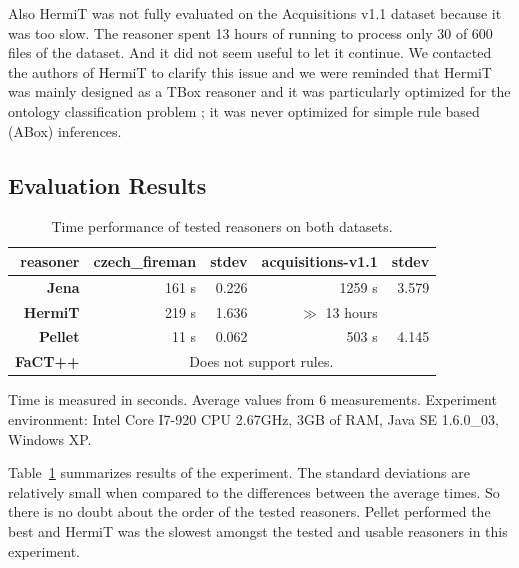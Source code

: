 Also HermiT was not fully evaluated on the Acquisitions v1.1 dataset because it was too slow. The reasoner spent 13 hours of running to process only 30 of 600 files of the dataset. And it did not seem useful to let it continue. We contacted the authors of HermiT to clarify this issue and we were reminded that HermiT was mainly designed as a TBox reasoner and it was particularly optimized for the ontology classification problem \citep{ghms10classification}; it was never optimized for simple rule based (ABox) inferences.












\subsection{Evaluation Results}



\begin{table}
\begin{center}
\begin{tabular}{|r||r|r||r|r|}
\hline
reasoner & \textbf{czech\_fireman} & stdev & \textbf{acquisitions-v1.1} & stdev\\
\hline
\hline
\textbf{Jena} & 161 s & 0.226 & 1259 s & 3.579\\
\hline
\textbf{HermiT} & 219 s & 1.636 & $\gg$ 13 hours & \\
\hline
\textbf{Pellet} & 11 s & 0.062 & 503 s & 4.145\\
\hline
\textbf{FaCT++} & \multicolumn{4}{|c|}{Does not support rules.}\\
\hline
\end{tabular}
\end{center}

Time is measured in seconds. Average values from 6 measurements. Experiment environment: Intel Core I7-920 CPU 2.67GHz, 3GB of RAM, Java SE 1.6.0\_03, Windows XP.

\caption{Time performance of tested reasoners on both datasets.}
\label{tab:results}
\end{table}

Table~\ref{tab:results} summarizes results of the experiment. The standard deviations are relatively small when compared to the differences between the average times.  So there is no doubt about the order of the tested reasoners. Pellet performed the best and HermiT was the slowest amongst the tested and usable reasoners in this experiment.

